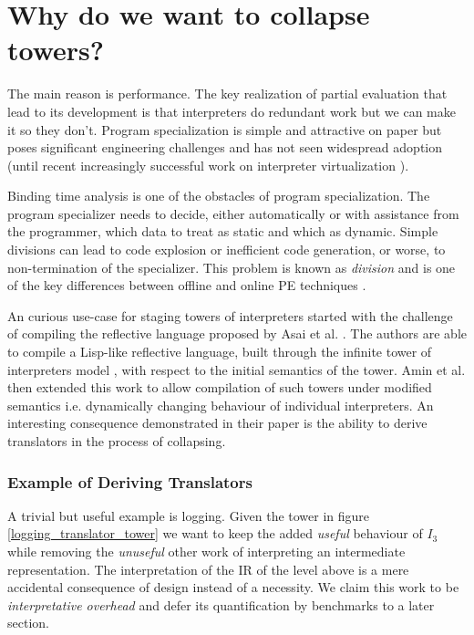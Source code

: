 \documentclass[fleqn]{article}
\theoremstyle{definition}
\begin{document}
\section{Why do we want to collapse towers?}
The main reason is performance. The key realization of partial evaluation that lead to its development is that interpreters do redundant work but we can make it so they don't. Program specialization
is simple and attractive on paper but poses significant engineering challenges and has not seen widespread adoption (until recent increasingly successful work on interpreter virtualization \cite{wurthinger2013one}).

Binding time analysis is one of the obstacles of program specialization. The program specializer needs to decide, either automatically or with assistance from the programmer, which data to treat as static and which as dynamic. Simple divisions
can lead to code explosion or inefficient code generation, or worse, to non-termination of the specializer. This problem is known as \textit{division} and is one of the key differences between offline and online PE techniques \cite{jones1993partial}.

An curious use-case for staging towers of interpreters started with the challenge of compiling the reflective language proposed by Asai et al. \cite{asai1997partial, asai2015compiling}. The authors are able to compile a Lisp-like reflective language, built through
the infinite tower of interpreters model \cite{smith1982reflection,wand1988mystery,danvy1988intensions}, with respect to the initial semantics of the tower. Amin et al. \cite{amin2017collapsing} then extended this work to allow compilation of such towers
under modified semantics i.e. dynamically changing behaviour of individual interpreters. An interesting consequence demonstrated in their paper is the ability to derive translators in the process of collapsing.

\subsubsection{Example of Deriving Translators}
A trivial but useful example is logging. Given the tower in figure \ref{logging_translator_tower} we want to keep the added \textit{useful} behaviour of $I_3$ while removing the \textit{unuseful} other work of interpreting an intermediate representation. The interpretation
of the IR of the level above is a mere accidental consequence of design instead of a necessity. We claim this work to be \textit{interpretative overhead} and defer its quantification by benchmarks to a later section.
\end{document}

